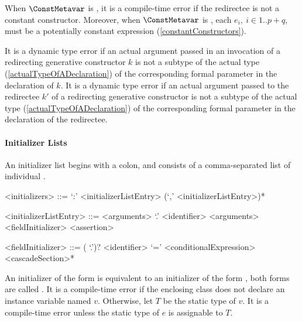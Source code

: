 \documentclass[makeidx]{article}
\begin{document}
\LMHash{}%
When $\ConstMetavar$ is \CONST{},
it is a compile-time error if the redirectee is not a constant constructor.
Moreover, when $\ConstMetavar$ is \CONST{}, each
$e_i,\ i \in 1 .. p+q$,
must be a potentially constant expression (\ref{constantConstructors}).

\LMHash{}%
It is a dynamic type error if an actual argument passed in an invocation of a redirecting generative constructor $k$
is not a subtype of the actual type (\ref{actualTypeOfADeclaration})
of the corresponding formal parameter in the declaration of $k$.
It is a dynamic type error if an actual argument passed to the redirectee $k'$ of a redirecting generative constructor
is not a subtype of the actual type
(\ref{actualTypeOfADeclaration})
of the corresponding formal parameter in the declaration of the redirectee.


\paragraph{Initializer Lists}

\LMHash{}%
An initializer list begins with a colon, and consists of a comma-separated list of individual .


\begin{grammar}
<initializers> ::= `:' <initializerListEntry> (`,' <initializerListEntry>)*

<initializerListEntry> ::= \SUPER{} <arguments>
  \alt \SUPER{} `.' <identifier> <arguments>
  \alt <fieldInitializer>
  \alt <assertion>

<fieldInitializer> ::= \gnewline{}
  (\THIS{} `.')? <identifier> `=' <conditionalExpression> <cascadeSection>*
\end{grammar}

\LMHash{}%
An initializer of the form  is equivalent to
an initializer of the form ,
both forms are called .
It is a compile-time error if the enclosing class does not declare an instance variable named $v$.
Otherwise, let $T$ be the static type of $v$.
It is a compile-time error unless the static type of $e$ is assignable to $T$.
\end{document}
